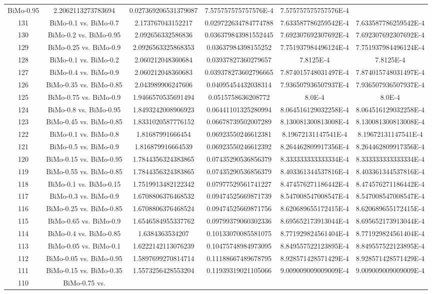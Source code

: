 \documentclass[a4paper,10pt]{article}
\begin{document}
\begin{landscape}
\begin{table}[!htp]
\begin{tabular}{cccccc}
BiMo-0.95&2.2062113273783694&0.027369206531379087&7.575757575757576E-4&7.575757575757576E-4\\131&BiMo-0.1 vs. BiMo-0.7&2.173767043152217&0.029722634784774788&7.633587786259542E-4&7.633587786259542E-4\\130&BiMo-0.2 vs. BiMo-0.95&2.092656332586836&0.036379843981552445&7.692307692307692E-4&7.692307692307692E-4\\129&BiMo-0.25 vs. BiMo-0.9&2.0926563325868353&0.03637984398155252&7.751937984496124E-4&7.751937984496124E-4\\128&BiMo-0.1 vs. BiMo-0.2&2.060212048360684&0.03937827360279657&7.8125E-4&7.8125E-4\\127&BiMo-0.4 vs. BiMo-0.9&2.060212048360683&0.039378273602796665&7.874015748031497E-4&7.874015748031497E-4\\126&BiMo-0.35 vs. BiMo-0.85&2.043989906247606&0.04095454432038314&7.936507936507937E-4&7.936507936507937E-4\\125&BiMo-0.75 vs. BiMo-0.9&1.9466570535691494&0.0515758636208772&8.0E-4&8.0E-4\\124&BiMo-0.8 vs. BiMo-0.95&1.8493242008906923&0.06441101325280994&8.064516129032258E-4&8.064516129032258E-4\\123&BiMo-0.45 vs. BiMo-0.85&1.8331020587776152&0.06678739502007289&8.130081300813008E-4&8.130081300813008E-4\\122&BiMo-0.1 vs. BiMo-0.8&1.81687991666454&0.06923550246612381&8.19672131147541E-4&8.19672131147541E-4\\121&BiMo-0.5 vs. BiMo-0.9&1.816879916664539&0.06923550246612392&8.264462809917356E-4&8.264462809917356E-4\\120&BiMo-0.15 vs. BiMo-0.95&1.7844356324383865&0.07435290536856379&8.333333333333334E-4&8.333333333333334E-4\\119&BiMo-0.55 vs. BiMo-0.85&1.7844356324383865&0.07435290536856379&8.403361344537816E-4&8.403361344537816E-4\\118&BiMo-0.1 vs. BiMo-0.15&1.7519913482122342&0.07977529561741227&8.474576271186442E-4&8.474576271186442E-4\\117&BiMo-0.3 vs. BiMo-0.9&1.6708806376468532&0.09474525669871739&8.547008547008547E-4&8.547008547008547E-4\\116&BiMo-0.25 vs. BiMo-0.85&1.6708806376468524&0.09474525669871756&8.620689655172415E-4&8.620689655172415E-4\\115&BiMo-0.65 vs. BiMo-0.9&1.6546584955337762&0.09799379060302336&8.695652173913044E-4&8.695652173913044E-4\\114&BiMo-0.4 vs. BiMo-0.85&1.6384363534207&0.10133070085581075&8.771929824561404E-4&8.771929824561404E-4\\113&BiMo-0.05 vs. BiMo-0.1&1.6222142113076239&0.10475748984973095&8.849557522123895E-4&8.849557522123895E-4\\112&BiMo-0.05 vs. BiMo-0.95&1.5897699270814714&0.11188667489678795&8.928571428571429E-4&8.928571428571429E-4\\111&BiMo-0.15 vs. BiMo-0.35&1.5573256428553204&0.11939319021105066&9.009009009009009E-4&9.009009009009009E-4\\110&BiMo-0.75 vs. 
\end{tabular}
\end{table}
\end{landscape}
\end{document}
